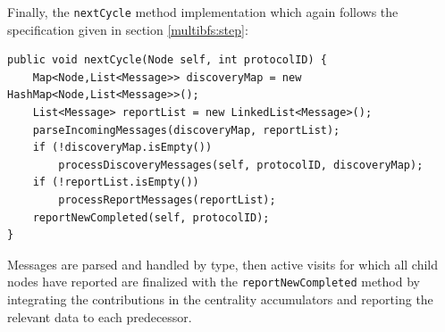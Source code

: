 Finally, the \texttt{nextCycle} method implementation which again follows the specification given in section \ref{multibfs:step}:
\begin{verbatim}
public void nextCycle(Node self, int protocolID) {
    Map<Node,List<Message>> discoveryMap = new HashMap<Node,List<Message>>();
    List<Message> reportList = new LinkedList<Message>();
    parseIncomingMessages(discoveryMap, reportList);
    if (!discoveryMap.isEmpty())
        processDiscoveryMessages(self, protocolID, discoveryMap);
    if (!reportList.isEmpty())
        processReportMessages(reportList);
    reportNewCompleted(self, protocolID);
}
\end{verbatim}
Messages are parsed and handled by type, then active visits for which all child nodes have reported are finalized with the \texttt{reportNewCompleted} method by integrating the contributions in the centrality accumulators and reporting the relevant data to each predecessor.